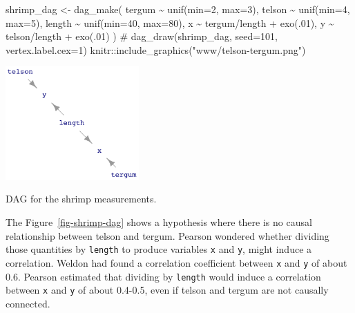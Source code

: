 \documentclass[
  letterpaper,
  DIV=11,
  numbers=noendperiod,
  oneside]{scrreprt}
\newenvironment{Shaded}{\begin{snugshade}}{\end{snugshade}}
\newcommand{\AttributeTok}[1]{\textcolor[rgb]{0.40,0.45,0.13}{#1}}
\newcommand{\CommentTok}[1]{\textcolor[rgb]{0.37,0.37,0.37}{#1}}
\newcommand{\DecValTok}[1]{\textcolor[rgb]{0.68,0.00,0.00}{#1}}
\newcommand{\FunctionTok}[1]{\textcolor[rgb]{0.28,0.35,0.67}{#1}}
\newcommand{\NormalTok}[1]{\textcolor[rgb]{0.00,0.23,0.31}{#1}}
\newcommand{\OtherTok}[1]{\textcolor[rgb]{0.00,0.23,0.31}{#1}}
\newcommand{\SpecialCharTok}[1]{\textcolor[rgb]{0.37,0.37,0.37}{#1}}
\newcommand{\StringTok}[1]{\textcolor[rgb]{0.13,0.47,0.30}{#1}}
\begin{document}
\begin{Shaded}
\begin{Highlighting}[]
\NormalTok{shrimp\_dag }\OtherTok{\textless{}{-}} \FunctionTok{dag\_make}\NormalTok{(}
\NormalTok{  tergum }\SpecialCharTok{\textasciitilde{}} \FunctionTok{unif}\NormalTok{(}\AttributeTok{min=}\DecValTok{2}\NormalTok{, }\AttributeTok{max=}\DecValTok{3}\NormalTok{),}
\NormalTok{  telson }\SpecialCharTok{\textasciitilde{}} \FunctionTok{unif}\NormalTok{(}\AttributeTok{min=}\DecValTok{4}\NormalTok{, }\AttributeTok{max=}\DecValTok{5}\NormalTok{),}
\NormalTok{  length }\SpecialCharTok{\textasciitilde{}} \FunctionTok{unif}\NormalTok{(}\AttributeTok{min=}\DecValTok{40}\NormalTok{, }\AttributeTok{max=}\DecValTok{80}\NormalTok{), }
\NormalTok{  x }\SpecialCharTok{\textasciitilde{}}\NormalTok{ tergum}\SpecialCharTok{/}\NormalTok{length }\SpecialCharTok{+} \FunctionTok{exo}\NormalTok{(.}\DecValTok{01}\NormalTok{),}
\NormalTok{  y }\SpecialCharTok{\textasciitilde{}}\NormalTok{ telson}\SpecialCharTok{/}\NormalTok{length }\SpecialCharTok{+} \FunctionTok{exo}\NormalTok{(.}\DecValTok{01}\NormalTok{)}
\NormalTok{)}
\CommentTok{\# dag\_draw(shrimp\_dag, seed=101, vertex.label.cex=1)}
\NormalTok{knitr}\SpecialCharTok{::}\FunctionTok{include\_graphics}\NormalTok{(}\StringTok{"www/telson{-}tergum.png"}\NormalTok{)}
\end{Highlighting}
\end{Shaded}

\begin{marginfigure}

{\centering \includegraphics[width=2.01in,height=\textheight]{./www/telson-tergum.png}

}

\caption{\label{fig-shrimp-dag}DAG for the shrimp measurements.}

\end{marginfigure}

The Figure~\ref{fig-shrimp-dag} shows a hypothesis where there is no
causal relationship between telson and tergum. Pearson wondered whether
dividing those quantities by \texttt{length} to produce variables
\texttt{x} and \texttt{y}, might induce a correlation. Weldon had found
a correlation coefficient between \texttt{x} and \texttt{y} of about
0.6. Pearson estimated that dividing by \texttt{length} would induce a
correlation between \texttt{x} and \texttt{y} of about 0.4-0.5, even if
telson and tergum are not causally connected.
\end{document}
